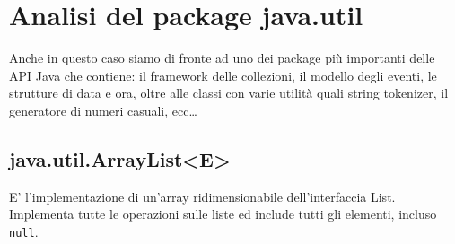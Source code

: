 	\section{Analisi del package java.util}
		Anche in questo caso siamo di fronte ad uno dei package più importanti delle API Java che contiene: il framework delle collezioni, il modello degli eventi, le strutture di data e ora, oltre alle classi con varie utilità quali string tokenizer, il generatore di numeri casuali, ecc\dots
		
		\subsection{java.util.ArrayList<E>}
		E' l'implementazione di un'array ridimensionabile dell'interfaccia List. Implementa tutte le operazioni sulle liste ed include tutti gli elementi, incluso \lstinline|null|.
		
